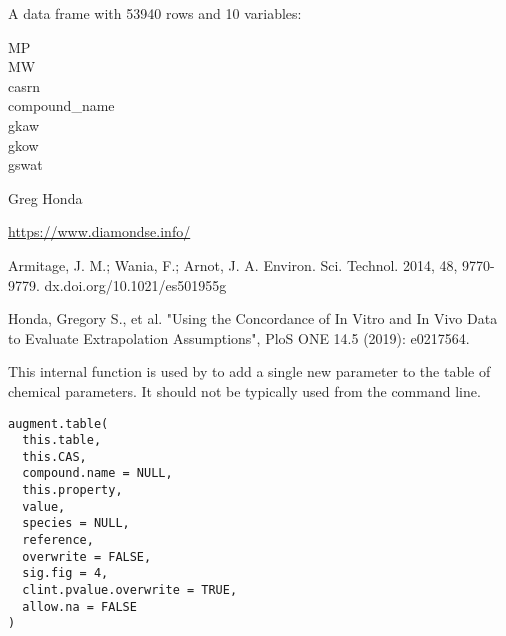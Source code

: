 \documentclass[a4paper]{book}
\begin{document}
%
\begin{Format}
A data frame with 53940 rows and 10 variables:
\begin{description}

\item[MP] 
\item[MW] 
\item[casrn] 
\item[compound\_name] 
\item[gkaw] 
\item[gkow] 
\item[gswat] 

\end{description}

\end{Format}
%
\begin{Author}\relax
Greg Honda
\end{Author}
%
\begin{Source}\relax
\url{https://www.diamondse.info/}
\end{Source}
%
\begin{References}\relax
Armitage, J. M.; Wania, F.; Arnot, J. A. Environ. Sci. Technol.
2014, 48, 9770-9779. dx.doi.org/10.1021/es501955g

Honda, Gregory S., et al. "Using the Concordance of In Vitro and
In Vivo Data to Evaluate Extrapolation Assumptions", PloS ONE 14.5 (2019): e0217564.
\end{References}
%
\begin{Description}\relax
This internal function is used by  to add a single 
new parameter to the table of chemical parameters. It should not be typically
used from the command line.
\end{Description}
%
\begin{Usage}
\begin{verbatim}
augment.table(
  this.table,
  this.CAS,
  compound.name = NULL,
  this.property,
  value,
  species = NULL,
  reference,
  overwrite = FALSE,
  sig.fig = 4,
  clint.pvalue.overwrite = TRUE,
  allow.na = FALSE
)
\end{verbatim}
\end{Usage}
%
\end{document}
